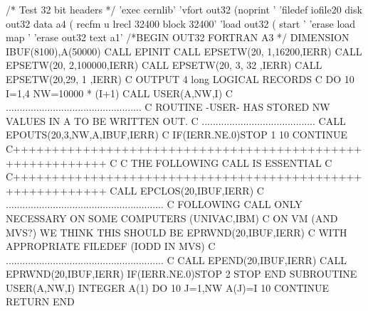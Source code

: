 \begin{XMP}
/* Test 32 bit headers */
'exec cernlib'
'vfort out32 (noprint '
'filedef iofile20 disk out32 data a4 ( recfm u lrecl 32400 block 32400'
'load out32 ( start '
'erase load map '
'erase out32 text a1'
/*BEGIN OUT32 FORTRAN A3 */
       DIMENSION IBUF(8100),A(50000)
       CALL EPINIT
       CALL EPSETW(20, 1,16200,IERR)
       CALL EPSETW(20, 2,100000,IERR)
       CALL EPSETW(20, 3,  32 ,IERR)
       CALL EPSETW(20,29,   1 ,IERR)
C   OUTPUT 4 long LOGICAL RECORDS
C
       DO 10  I=1,4
        NW=10000 * (I+1)
        CALL USER(A,NW,I)
C  .................................................
C     ROUTINE -USER- HAS STORED NW VALUES IN A TO BE WRITTEN OUT.
C   .........................................
        CALL EPOUTS(20,3,NW,A,IBUF,IERR)
C       IF(IERR.NE.0)STOP 1
   10  CONTINUE
C++++++++++++++++++++++++++++++++++++++++++++++++++++++++++
C
C                THE FOLLOWING CALL IS ESSENTIAL
C
C++++++++++++++++++++++++++++++++++++++++++++++++++++++++++
       CALL EPCLOS(20,IBUF,IERR)
C  .........................................................
C   FOLLOWING CALL ONLY NECESSARY ON SOME COMPUTERS (UNIVAC,IBM)
C    ON VM (AND MVS?) WE THINK THIS SHOULD BE EPRWND(20,IBUF,IERR)
C    WITH APPROPRIATE FILEDEF (IODD IN MVS)
C  .........................................................
C      CALL EPEND(20,IBUF,IERR)
       CALL EPRWND(20,IBUF,IERR)
       IF(IERR.NE.0)STOP 2
       STOP
       END
       SUBROUTINE USER(A,NW,I)
       INTEGER A(1)
       DO 10 J=1,NW
       A(J)=I
   10  CONTINUE
       RETURN
       END
\end{XMP}
